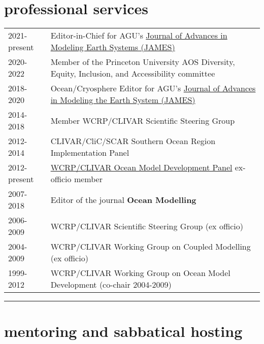 \documentclass{article}
\begin{document}
\vspace{-.4cm}
\section*{\sc  \color{Maroon}  professional services}
\vspace{-.25cm}

\begin{tabular}{ll}

2021-present & Editor-in-Chief for  AGU's  \href{http://agupubs.onlinelibrary.wiley.com/hub/journal/10.1002/(ISSN)1942-2466/editorial-board/editorial-board.html}{Journal of Advances in Modeling Earth Systems (JAMES)} 
 \\
 2020-2022 & Member of the Princeton University AOS Diversity, Equity, Inclusion, and Accessibility committee
 \\
2018-2020 & Ocean/Cryosphere Editor for AGU's  \href{http://agupubs.onlinelibrary.wiley.com/hub/journal/10.1002/(ISSN)1942-2466/editorial-board/editorial-board.html}{Journal of Advances in Modeling the Earth System (JAMES)} 
  \\
2014-2018 &  Member  WCRP/CLIVAR Scientific Steering Group \\
2012-2014     & CLIVAR/CliC/SCAR Southern Ocean Region Implementation Panel \\
2012-present &  \href{http://www.clivar.org/clivar-panels/omdp}{WCRP/CLIVAR Ocean Model Development Panel} ex-officio member
\\
2007-2018 & Editor of the journal {\bf Ocean Modelling} \\
2006-2009     &  WCRP/CLIVAR Scientific Steering Group (ex officio) \\
2004-2009     &  WCRP/CLIVAR Working Group on Coupled Modelling (ex officio) \\
1999-2012     & WCRP/CLIVAR Working Group on Ocean Model Development  (co-chair 2004-2009) \\
\end{tabular}


\noindent\rule{\textwidth}{1pt}
\vspace{-1cm}
\section*{\sc  \color{Maroon} mentoring and sabbatical hosting}
\vspace{-.25cm}
\end{document}
